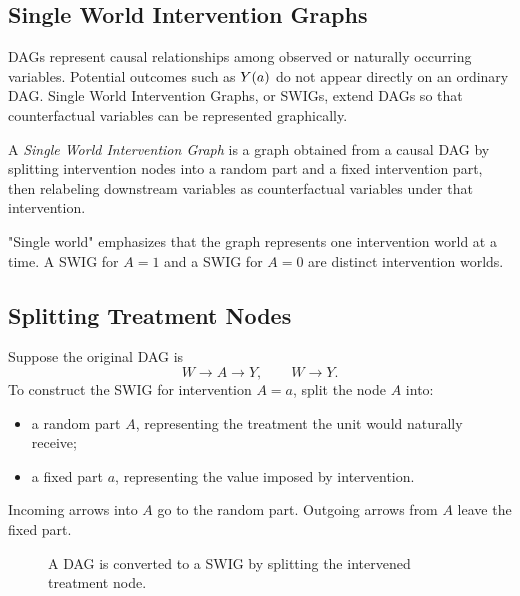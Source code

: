 \label{lec:2-8}

\subsection{Single World Intervention Graphs}

DAGs represent causal relationships among observed or naturally occurring variables. Potential outcomes such as $Y(a)$ do not appear directly on an ordinary DAG. Single World Intervention Graphs, or SWIGs, extend DAGs so that counterfactual variables can be represented graphically.

\begin{definition}
A \emph{Single World Intervention Graph} is a graph obtained from a causal DAG by splitting intervention nodes into a random part and a fixed intervention part, then relabeling downstream variables as counterfactual variables under that intervention.
\end{definition}

"Single world" emphasizes that the graph represents one intervention world at a time. A SWIG for $A=1$ and a SWIG for $A=0$ are distinct intervention worlds.

\subsection{Splitting Treatment Nodes}

Suppose the original DAG is
\[
W\to A\to Y,\qquad W\to Y.
\]
To construct the SWIG for intervention $A=a$, split the node $A$ into:
\begin{itemize}
  \item a random part $A$, representing the treatment the unit would naturally receive;
  \item a fixed part $a$, representing the value imposed by intervention.
\end{itemize}
Incoming arrows into $A$ go to the random part. Outgoing arrows from $A$ leave the fixed part.

\begin{figure}[H]
\centering
{}
\caption{A DAG is converted to a SWIG by splitting the intervened treatment node.}
\end{figure}

